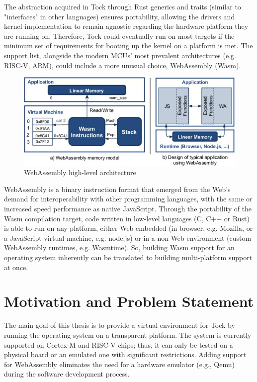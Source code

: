 \documentclass[12pt,a4paper]{report}
\begin{document}
The abstraction acquired in Tock through Rust generics and traits (similar to "interfaces"
in other languages) ensures portability, allowing the drivers and kernel implementation to
remain agnostic regarding the hardware platform they are running on. Therefore, Tock could
eventually run on most targets if the minimum set of requirements for booting up the
kernel on a platform is met. The support list, alongside the modern MCUs' most prevalent
architectures (e.g. RISC-V, ARM), could include a more unusual choice, WebAssembly
(Wasm).

\begin{figure}[H]
\centering
\includegraphics[scale=1.65]{pics/WebAssembly-high-level-architecture_W640-2.jpg}
  \caption[WebAssembly high-level architecture]{WebAssembly high-level architecture}
  \label{fig:wasm}
\end{figure}

WebAssembly is a binary instruction format that emerged from the Web's demand for interoperability with other programming languages, with the same or increased speed performance as native JavaScript. Through the portability of the Wasm compilation target, code written in low-level languages (C, C++ or Rust) is able to run on any platform, either Web embedded (in browser, e.g. Mozilla, or a JavaScript virtual machine, e.g. node.js) or in a non-Web environment (custom WebAssembly runtimes, e.g. Wasmtime). So, building Wasm support for an operating system inherently can be translated to building multi-platform support at once.


\section{Motivation and Problem Statement} 

The main goal of this thesis is to provide a virtual environment for Tock by running the operating system on a transparent platform. The system is currently supported on Cortex-M and RISC-V chips; thus, it can only be tested on a physical board or an emulated one with significant restrictions. Adding support for WebAssembly eliminates the need for a hardware emulator (e.g., Qemu) during the software development process.
\end{document}
